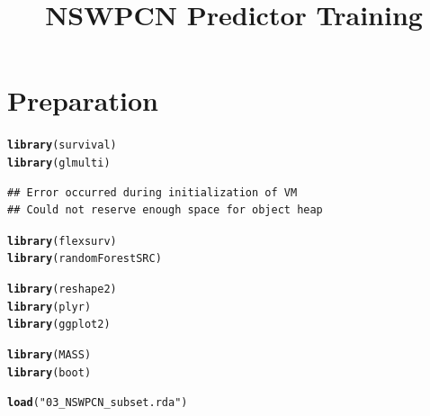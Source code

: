 \documentclass{article}\usepackage[]{graphicx}\usepackage[]{color}
\makeatletter
\newcommand{\hlstr}[1]{\textcolor[rgb]{0.192,0.494,0.8}{#1}}%
\newcommand{\hlstd}[1]{\textcolor[rgb]{0.345,0.345,0.345}{#1}}%
\newcommand{\hlkwd}[1]{\textcolor[rgb]{0.737,0.353,0.396}{\textbf{#1}}}%
\newenvironment{kframe}{%
 \def\at@end@of@kframe{}%
 \ifinner\ifhmode%
  \def\at@end@of@kframe{\end{minipage}}%
  \begin{minipage}{\columnwidth}%
 \fi\fi%
 \def\FrameCommand##1{\hskip\@totalleftmargin \hskip-\fboxsep
 \colorbox{shadecolor}{##1}\hskip-\fboxsep
     \hskip-\linewidth \hskip-\@totalleftmargin \hskip\columnwidth}%
 \MakeFramed {\advance\hsize-\width
   \@totalleftmargin\z@ \linewidth\hsize
   \@setminipage}}%
 {\par\unskip\endMakeFramed%
 \at@end@of@kframe}
\newenvironment{knitrout}{}{} %
\makeatother
\begin{document}
\title{NSWPCN Predictor Training}
\maketitle

\section{Preparation}
\begin{knitrout}
\color{fgcolor}\begin{kframe}
\begin{alltt}
\hlkwd{library}\hlstd{(survival)}
\hlkwd{library}\hlstd{(glmulti)}
\end{alltt}
\begin{verbatim}
## Error occurred during initialization of VM
## Could not reserve enough space for object heap
\end{verbatim}


{\ttfamily\noindent\bfseries\color{errorcolor}{\#\# Error: package or namespace load failed for 'glmulti'}}\begin{alltt}
\hlkwd{library}\hlstd{(flexsurv)}
\hlkwd{library}\hlstd{(randomForestSRC)}

\hlkwd{library}\hlstd{(reshape2)}
\hlkwd{library}\hlstd{(plyr)}
\hlkwd{library}\hlstd{(ggplot2)}

\hlkwd{library}\hlstd{(MASS)}
\hlkwd{library}\hlstd{(boot)}

\hlkwd{load}\hlstd{(}\hlstr{"03_NSWPCN_subset.rda"}\hlstd{)}
\end{alltt}
\end{kframe}
\end{knitrout}


\end{document}
